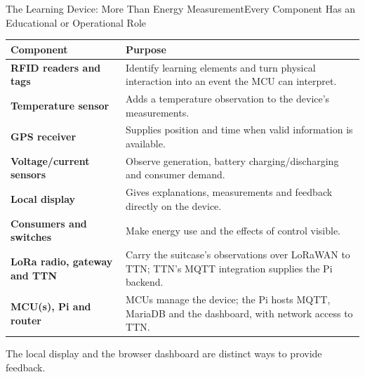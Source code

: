 \begin{frame}{The Learning Device: More Than Energy Measurement}{Every Component Has an Educational or Operational Role}
\small\renewcommand{\arraystretch}{1.4}
\par\noindent\begin{tabularx}{\textwidth}{@{}>{\raggedright\arraybackslash}p{}>{\raggedright\arraybackslash}X@{}}
\toprule
\textbf{Component} & \textbf{Purpose}\\\midrule
\textbf{RFID readers and tags} & Identify learning elements and turn physical interaction into an event the MCU can interpret.\\
\textbf{Temperature sensor} & Adds a temperature observation to the device's measurements.\\
\textbf{GPS receiver} & Supplies position and time when valid information is available.\\
\textbf{Voltage/current sensors} & Observe generation, battery charging/discharging and consumer demand.\\
\textbf{Local display} & Gives explanations, measurements and feedback directly on the device.\\
\textbf{Consumers and switches} & Make energy use and the effects of control visible.\\
\textbf{LoRa radio, gateway and TTN} & Carry the suitcase's observations over LoRaWAN to TTN; TTN's MQTT integration supplies the Pi backend.\\
\textbf{MCU(s), Pi and router} & MCUs manage the device; the Pi hosts MQTT, MariaDB and the dashboard, with network access to TTN.\\\bottomrule
\end{tabularx}\par
\vspace{.5em}
\normalsize\alert{The local display and the browser dashboard are distinct ways to provide feedback.}
\end{frame}

